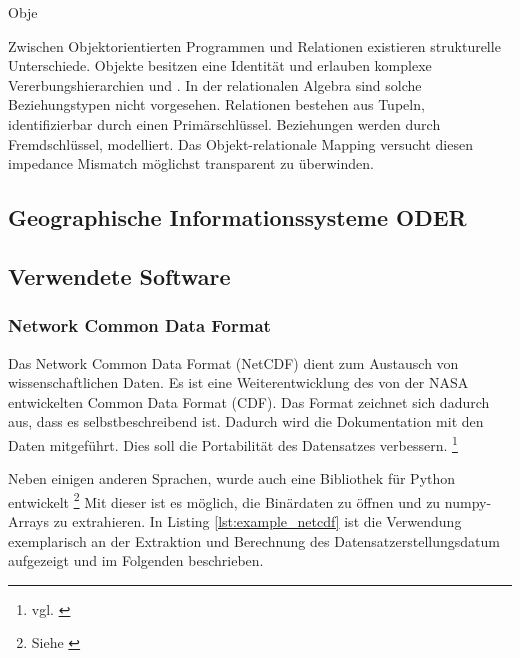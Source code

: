     Obje
    
    Zwischen Objektorientierten Programmen und Relationen existieren strukturelle Unterschiede. 
    Objekte besitzen eine Identität und erlauben komplexe Vererbungshierarchien und . In der relationalen Algebra sind solche Beziehungstypen nicht vorgesehen. 
    Relationen bestehen aus Tupeln, identifizierbar durch einen Primärschlüssel. Beziehungen werden durch Fremdschlüssel, modelliert. Das Objekt-relationale Mapping versucht diesen impedance Mismatch möglichst transparent zu überwinden.
    



    \subsection{Geographische Informationssysteme  ODER }


    \subsection{Verwendete Software}
    \subsubsection{Network Common Data Format}
    
    Das Network Common Data Format (NetCDF) dient zum Austausch von wissenschaftlichen Daten. Es ist eine Weiterentwicklung des von der NASA entwickelten Common Data Format (CDF). Das Format zeichnet sich dadurch aus, dass es selbstbeschreibend ist. Dadurch wird die Dokumentation mit den Daten mitgeführt. Dies soll die Portabilität des Datensatzes verbessern.  \footnote{vgl. \cite{FisherNetCDF}}
   
    Neben einigen anderen Sprachen, wurde auch eine Bibliothek für Python entwickelt \footnote{Siehe \cite{netCDF4}} Mit dieser ist es möglich, die Binärdaten zu öffnen und zu numpy-Arrays zu extrahieren. In Listing \ref{lst:example_netcdf} ist die Verwendung exemplarisch an der Extraktion und Berechnung des Datensatzerstellungsdatum aufgezeigt und im Folgenden beschrieben.
    
    
